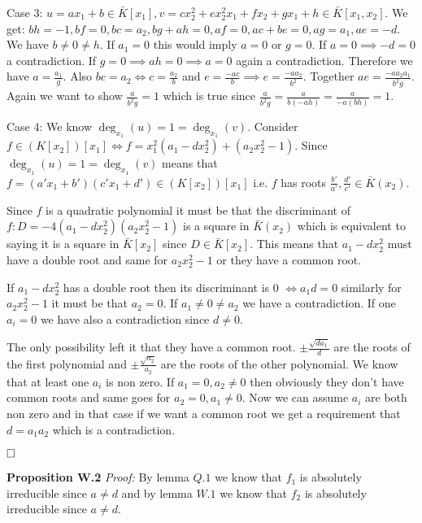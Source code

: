 \documentclass[12pt, a4paper]{article}
\newcommand{\qed}{\hfill\square}
\begin{document}
Case 3: $u = ax_1+b \in \bar{K}[x_1], v = cx_2^2+ex_2^2x_1+fx_2+gx_1+h \in \bar{K}[x_1,x_2]$. We get: $bh=-1, bf=0, bc=a_2, bg+ah=0, af=0, ac+be=0, ag=a_1, ae=-d$. We have $b \neq 0 \neq h$. If $a_1 = 0$ this would imply $a = 0$ or $g = 0$. If $a = 0 \implies -d = 0$ a contradiction. If $g = 0 \implies ah = 0 \implies a = 0$ again a contradiction. Therefore we have $a = \frac{a_1}{g}$. Also $bc=a_2 \iff c = \frac{a_2}{b}$ and $e = \frac{-ac}{b} \implies e = \frac{-aa_2}{b^2}$. Together $ae = \frac{-aa_2a_1}{b^2g}$. Again we want to show $\frac{a}{b^2g} = 1$ which is true since $\frac{a}{b^2g}=\frac{a}{b(-ah)} = \frac{a}{-a(bh)} = 1$.

Case 4: We know $\deg_{x_1}(u)=1=\deg_{x_1}(v)$. Consider $f \in (K[x_2])[x_1] \iff f = x_1^2(a_1-dx_2^2)+(a_2x_2^2-1)$. Since $\deg_{x_1}(u)=1=\deg_{x_1}(v)$ means that $f = (a'x_1+b')(c'x_1+d') \in (K[x_2])[x_1]$ i.e. $f$ has roots $\frac{b'}{a'}, \frac{d'}{c'} \in \bar{K}(x_2)$. 

Since $f$ is a quadratic polynomial it must be that the discriminant of $f: D= -4(a_1-dx_2^2)(a_2x_2^2-1)$ is a square in $\bar{K}(x_2)$ which is equivalent to saying it is a square in $\bar{K}[x_2]$ since $D \in \bar{K}[x_2]$. This means that $a_1-dx_2^2$ must have a double root and same for $a_2x_2^2-1$ or they have a common root. 

If $a_1-dx_2^2$ has a double root then its discriminant is 0 $\iff a_1d = 0$ similarly for $a_2x_2^2-1$ it must be that $a_2 = 0$. If $a_1 \neq 0 \neq a_2$ we have a contradiction. If one $a_i=0$ we have also a contradiction since $d \neq 0$. 

The only possibility left it that they have a common root. $\pm\frac{\sqrt{da_1}}{d}$ are the roots of the first polynomial and $\pm\frac{\sqrt{a_2}}{a_2}$ are the roots of the other polynomial. We know that at least one $a_i$ is non zero. If $a_1 = 0, a_2 \neq 0$ then obviously they don't have common roots and same goes for $a_2 = 0, a_1 \neq 0$. Now we can assume $a_i$ are both non zero and in that case if we want a common root we get a requirement that $d=a_1a_2$ which is a contradiction.

$\qed$


\textbf{Proposition W.2} \textit{Proof:}
By lemma $Q.1$ we know that $f_1$ is absolutely irreducible since $a\neq d$ and by lemma $W.1$ we know that $f_2$ is absolutely irreducible since $a \neq d$. 
\end{document}
